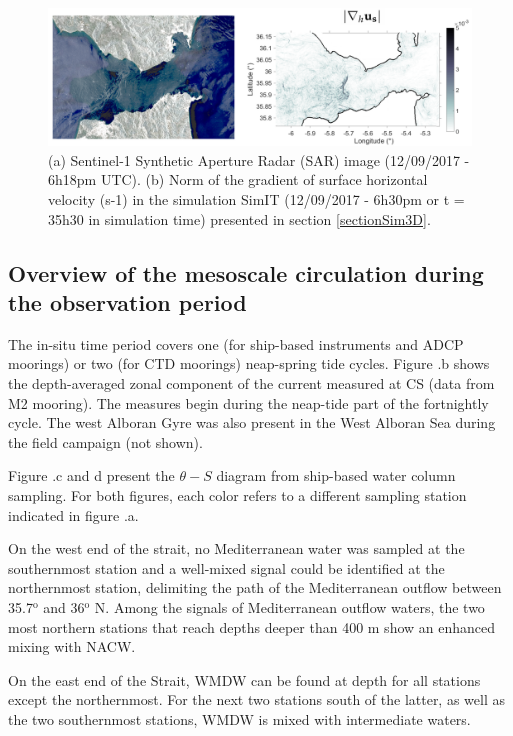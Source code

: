 \begin{figure}[!h]
 \includegraphics[width=\textwidth]{./GBR3D/Comp_SAR_IES.png}
 \caption {(a) Sentinel-1 Synthetic Aperture Radar (SAR) image (12/09/2017 - 6h18pm UTC). (b) Norm of the gradient of surface horizontal velocity (s-1) in the simulation SimIT (12/09/2017 - 6h30pm or t = 35h30 in simulation time) presented in section \ref{sectionSim3D}.}
 \label{fig_SARIES}
\end{figure}


\subsection{Overview of the mesoscale circulation during the observation period}

The in-situ time period covers one (for ship-based instruments and ADCP moorings) or two (for CTD moorings) neap-spring tide cycles. Figure .b shows the depth-averaged zonal component of the current measured at CS (data from M2 mooring). The measures begin during the neap-tide part of the fortnightly cycle. The west Alboran Gyre was also present in the West Alboran Sea during the field campaign (not shown). 

Figure .c and d present the $\theta-S$ diagram from ship-based water column sampling. For both figures, each color refers to a different sampling station indicated in figure .a.

On the west end of the strait, no Mediterranean water was sampled at the southernmost station and a well-mixed signal could be identified at the northernmost station, delimiting the path of the Mediterranean outflow between 35.7$^{\text{o}}$ and 36$^{\text{o}}$ N. Among the signals of Mediterranean outflow waters, the two most northern stations that reach depths \color{blue} deeper than 400 m show an enhanced mixing with \color{black} NACW.

On the east end of the Strait, WMDW can be found at depth for all stations except the northernmost. For the next two stations south of the latter, as well as the two southernmost stations, WMDW is mixed with intermediate waters. 

